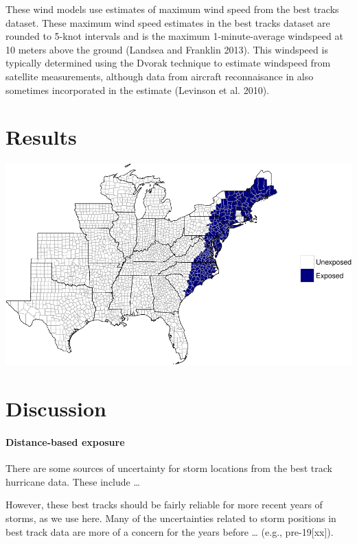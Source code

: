 \documentclass[]{elsarticle} %
\makeatletter
\def\maxwidth{\ifdim\Gin@nat@width>\linewidth\linewidth
\else\Gin@nat@width\fi}
\let\Oldincludegraphics\includegraphics
\renewcommand{\includegraphics}[1]{\Oldincludegraphics[width=\maxwidth]{#1}}
\makeatother
\begin{document}
These wind models use estimates of maximum wind speed from the best
tracks dataset. These maximum wind speed estimates in the best tracks
dataset are rounded to 5-knot intervals and is the maximum
1-minute-average windspeed at 10 meters above the ground (Landsea and
Franklin 2013). This windspeed is typically determined using the Dvorak
technique to estimate windspeed from satellite measurements, although
data from aircraft reconnaisance in also sometimes incorporated in the
estimate (Levinson et al. 2010).

\section{Results}\label{results}

\includegraphics{DraftExposurePaper_files/figure-latex/unnamed-chunk-2-1.pdf}

\section{Discussion}\label{discussion}

\paragraph{Distance-based exposure}\label{distance-based-exposure-1}

There are some sources of uncertainty for storm locations from the best
track hurricane data. These include \ldots{}

However, these best tracks should be fairly reliable for more recent
years of storms, as we use here. Many of the uncertainties related to
storm positions in best track data are more of a concern for the years
before \ldots{} (e.g., pre-19{[}xx{]}).
\end{document}
